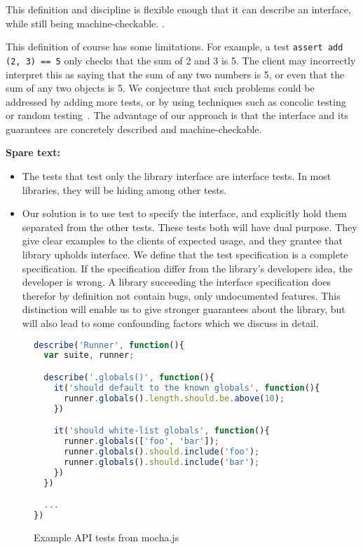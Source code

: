 This definition and discipline is flexible enough that it can describe
an interface, while still being machine-checkable. .

 This definition of course has some limitations. For
example, a test \texttt{assert add (2, 3) == 5} only checks that the
sum of 2 and 3 is 5. The client may incorrectly interpret this as
saying that the sum of any two numbers is 5, or even that the sum of
any two objects is 5. We conjecture that such problems could be
addressed by adding more tests, or by using techniques such as
concolic testing~\cite{sen05-cute} or random
testing~\cite{quickcheck}. The advantage of our approach is that the
interface and its guarantees are concretely described and
machine-checkable.


{\bf Spare text:}
\begin{itemize}
\item The tests that test only the library interface are interface tests. In
most libraries, they will be hiding among other tests.
\item Our solution is to use test to specify the interface, and explicitly
hold them separated from the other tests. These tests both will have
dual purpose. They give clear examples to the clients of expected
usage, and they grantee that library upholds interface. We define that
the test specification is a complete specification. If the
specification differ from the library's developers idea, the developer
is wrong.  A library succeeding the interface specification does
therefor by definition not contain bugs, only undocumented
features. This distinction will enable us to give stronger guarantees
about the library, but will also lead to some confounding factors
which we discuss in detail.

\end{itemize}

\begin{figure*}
\begin{lstlisting}[language=javascript]
describe('Runner', function(){
  var suite, runner;

  describe('.globals()', function(){
    it('should default to the known globals', function(){
      runner.globals().length.should.be.above(10);
    })

    it('should white-list globals', function(){
      runner.globals(['foo', 'bar']);
      runner.globals().should.include('foo');
      runner.globals().should.include('bar');
    })
  })

  ...
})
\end{lstlisting}

\caption{Example API tests from mocha.js}
\label{fig:spec-example}
\end{figure*}

